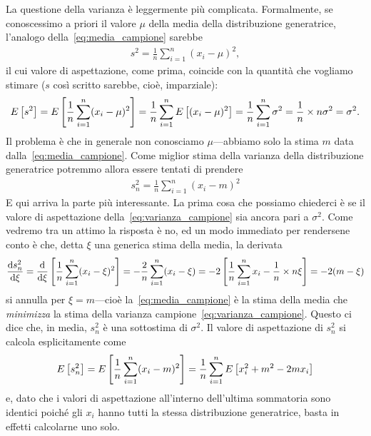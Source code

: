 La questione della varianza è leggermente più complicata. Formalmente, se
conoscessimo a priori il valore $\mu$ della media della distribuzione
generatrice, l'analogo della~\eqref{eq:media_campione} sarebbe
\begin{align*}
  s^2 = \frac{1}{n}\sum_{i = 1}^n (x_i - \mu)^2,
\end{align*}
il cui valore di aspettazione, come prima, coincide con la quantità che
vogliamo stimare ($s$ così scritto sarebbe, cioè, imparziale):
\begin{align*}
  \displaystyle E\left[s^2\right] = \displaystyle E\left[\frac{1}{n}\sum_{i = 1}^n (x_i - \mu)^2\right] =
  \frac{1}{n}\sum_{i = 1}^n\displaystyle E\left[(x_i - \mu)^2\right] =
  \frac{1}{n}\sum_{i = 1}^n \sigma^2 = \frac{1}{n} \times n\sigma^2 = \sigma^2.
\end{align*}
Il problema è che in generale non conosciamo $\mu$---abbiamo solo la stima
$m$ data dalla~\eqref{eq:media_campione}. Come miglior stima della varianza
della distribuzione generatrice potremmo allora essere tentati di prendere
\begin{align}\label{eq:varianza_campione}
  s_n^2 = \frac{1}{n}\sum_{i = 1}^n (x_i - m)^2
\end{align}
E qui arriva la parte più interessante. La prima cosa che possiamo chiederci
è se il valore di aspettazione della~\eqref{eq:varianza_campione} sia ancora
pari a $\sigma^2$. Come vedremo tra un attimo la risposta è no, ed un modo
immediato per rendersene conto è che, detta $\xi$ una generica stima della
media, la derivata
\begin{align*}
  \td{s_n^2}{\xi}{} =
  \td{}{\xi}{} \left[\frac{1}{n}\sum_{i = 1}^n (x_i - \xi)^2\right] =
  -\frac{2}{n}\sum_{i = 1}^n (x_i - \xi) =
  -2 \left[ \frac{1}{n} \sum_{i = 1}^n x_i - \frac{1}{n} \times n\xi\right] =
  -2 (m - \xi)
\end{align*}
si annulla per $\xi = m$---cioè la~\eqref{eq:media_campione} è la stima
della media che \emph{minimizza} la stima della varianza
campione~\eqref{eq:varianza_campione}. Questo ci dice che, in media,
$s_n^2$ è una sottostima di $\sigma^2$.
Il valore di aspettazione di $s^2_n$ si calcola esplicitamente come
\begin{align*}
  \displaystyle E\left[s^2_n\right] = \displaystyle E\left[\frac{1}{n}\sum_{i = 1}^n (x_i - m)^2\right] =
  \frac{1}{n}\sum_{i = 1}^n \displaystyle E\left[x_i^2 + m^2 - 2mx_i\right]
\end{align*}
e, dato che i valori di aspettazione all'interno dell'ultima sommatoria sono
identici poiché gli $x_i$ hanno tutti la stessa distribuzione generatrice,
basta in effetti calcolarne uno solo.
